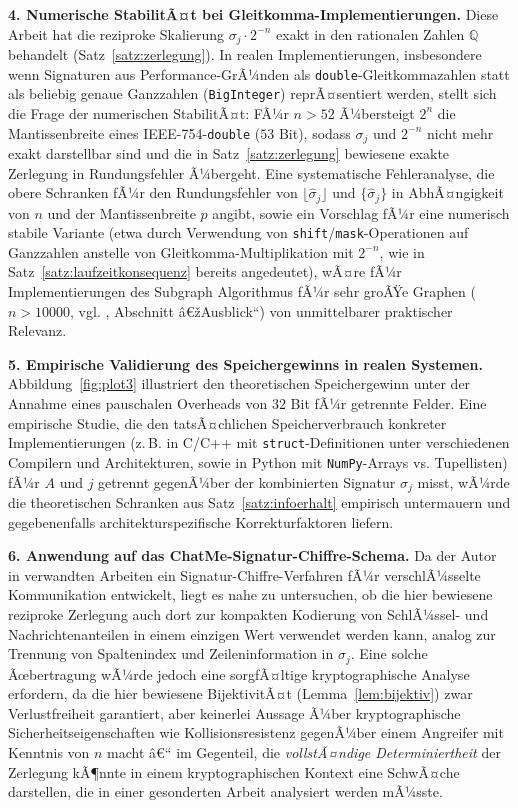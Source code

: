 ﻿\documentclass[a4paper,12pt]{article}
\theoremstyle{definition}
\begin{document}
\textbf{4. Numerische StabilitÃ¤t bei Gleitkomma-Implementierungen.} Diese
Arbeit hat die reziproke Skalierung $\sigma_j\cdot2^{-n}$ exakt in den
rationalen Zahlen $\mathbb{Q}$ behandelt (Satz~\ref{satz:zerlegung}). In
realen Implementierungen, insbesondere wenn Signaturen aus
Performance-GrÃ¼nden als \texttt{double}-Gleitkommazahlen statt als
beliebig genaue Ganzzahlen (\texttt{BigInteger}) reprÃ¤sentiert werden,
stellt sich die Frage der numerischen StabilitÃ¤t: FÃ¼r $n > 52$ Ã¼bersteigt
$2^n$ die Mantissenbreite eines IEEE-754-\texttt{double} ($53$ Bit), sodass
$\sigma_j$ und $2^{-n}$ nicht mehr exakt darstellbar sind und die in
Satz~\ref{satz:zerlegung} bewiesene exakte Zerlegung in Rundungsfehler
Ã¼bergeht. Eine systematische Fehleranalyse, die obere Schranken fÃ¼r den
Rundungsfehler von $\lfloor\hat\sigma_j\rfloor$ und $\{\hat\sigma_j\}$ in
AbhÃ¤ngigkeit von $n$ und der Mantissenbreite $p$ angibt, sowie ein
Vorschlag fÃ¼r eine numerisch stabile Variante (etwa durch Verwendung von
\texttt{shift}/\texttt{mask}-Operationen auf Ganzzahlen anstelle von
Gleitkomma-Multiplikation mit $2^{-n}$, wie in
Satz~\ref{satz:laufzeitkonsequenz} bereits angedeutet), wÃ¤re fÃ¼r
Implementierungen des Subgraph Algorithmus fÃ¼r sehr groÃŸe Graphen
($n>10000$, vgl. \cite{epp2026subgraph}, Abschnitt â€žAusblick``) von
unmittelbarer praktischer Relevanz.

\textbf{5. Empirische Validierung des Speichergewinns in realen
Systemen.} Abbildung~\ref{fig:plot3} illustriert den theoretischen
Speichergewinn unter der Annahme eines pauschalen Overheads von $32$ Bit
fÃ¼r getrennte Felder. Eine empirische Studie, die den tatsÃ¤chlichen
Speicherverbrauch konkreter Implementierungen (z.\,B. in C/C++ mit
\texttt{struct}-Definitionen unter verschiedenen Compilern und
Architekturen, sowie in Python mit \texttt{NumPy}-Arrays vs. Tupellisten)
fÃ¼r $A$ und $j$ getrennt gegenÃ¼ber der kombinierten Signatur $\sigma_j$
misst, wÃ¼rde die theoretischen Schranken aus
Satz~\ref{satz:infoerhalt} empirisch untermauern und gegebenenfalls
architekturspezifische Korrekturfaktoren liefern.

\textbf{6. Anwendung auf das ChatMe-Signatur-Chiffre-Schema.} Da der
Autor in verwandten Arbeiten ein Signatur-Chiffre-Verfahren fÃ¼r
verschlÃ¼sselte Kommunikation entwickelt, liegt es nahe zu untersuchen, ob
die hier bewiesene reziproke Zerlegung auch dort zur kompakten Kodierung
von SchlÃ¼ssel- und Nachrichtenanteilen in einem einzigen Wert verwendet
werden kann, analog zur Trennung von Spaltenindex und Zeileninformation in
$\sigma_j$. Eine solche Ãœbertragung wÃ¼rde jedoch eine sorgfÃ¤ltige
kryptographische Analyse erfordern, da die hier bewiesene BijektivitÃ¤t
(Lemma~\ref{lem:bijektiv}) zwar Verlustfreiheit garantiert, aber keinerlei
Aussage Ã¼ber kryptographische Sicherheitseigenschaften wie
Kollisionsresistenz gegenÃ¼ber einem Angreifer mit Kenntnis von $n$ macht â€“
im Gegenteil, die \emph{vollstÃ¤ndige Determiniertheit} der Zerlegung kÃ¶nnte
in einem kryptographischen Kontext eine SchwÃ¤che darstellen, die in einer
gesonderten Arbeit analysiert werden mÃ¼sste.
\end{document}
